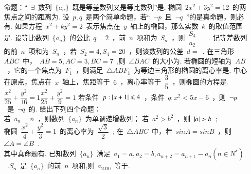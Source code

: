 \documentclass{BHCexam}
\begin{document}
\maketitle
\notice
\begin{questions}

\xuanze
\question 命题：“~$\exists$~数列~$\{a_n \}$~既是等差数列又是等比数列”是\xx.
\question 椭圆~$2x^2+3y^2=12$~的两焦点之间的距离为\xx.
\question 设~$p,q$~是两个简单命题，若“~$\neg p$~且~$\neg q$~”的是真命题，则必有\xx.
\question 如果方程~$x^2+ky^2=2$~表示焦点在~$y$~轴上的椭圆，那么实数~$k$~的取值范围是\xx.
\question 设等比数列~$\{a_n \}$~的公比~$q=2$~，前~$n$~项和为~$S_n$~，则~$\dfrac{S_4}{a_2}=$~\xx.
\question 记等差数列的前~$n$~项和为~$S_n$~，若~$S_2=4,S_4=20$~，则该数列的公差~$d=$~\xx.
\question 在三角形~$ABC$~中，~$AB=5,AC=3,BC=7$~,则~$\angle BAC$~的大小为\xx.
\question 若椭圆的短轴为~$AB$~，它的一个焦点为~$F_1$~，则满足~$\triangle ABF_1$~为等边三角形的椭圆的离心率是\xx.
\question 中心在原点，焦点在~$x$~轴上，焦距等于~$6$~，离心率等于~$\dfrac{3}{5}$~，则椭圆的方程是\xx.
%
{$\dfrac{x^2}{25}+\dfrac{y^2}{16}=1$}{$\dfrac{x^2}{25}+\dfrac{y^2}{9}=1$}
\question 若条件~$p:\left| x+1 \right|\leqslant 4$~，条件~$q:x^2<5x-6$~，则~$\neg p$~是~$\neg q$~的\xx.
\question 给出下列四个命题：\\
 若~$a_n=n$~，则数列~$\{a_n \}$~为单调递增数列；\qquad   {} 若~$a^2>b^2$~，则~$\abs{a}>b$~;\\
椭圆~$\dfrac{x^2}{4}+\dfrac{y^2}{3}=1$~的离心率为~$\dfrac{\sqrt{3}}{2}$~;\quad  {} 在~$\triangle ABC$~中，若~$sinA=sinB$~，则~$\angle A=\angle B$~.\\
其中真命题有\xx.
\question 已知数列~$\{a_n \}$~满足~$a_1=a,a_2=b,a_{n+2}=a_{n+1}-a_n (n\in N^*)$~.$S_n$~是~$\{a_n \}$~的前~$n$~项和,则~$a_{2010}$~等于\xx.

\end{questions}
\end{document}
